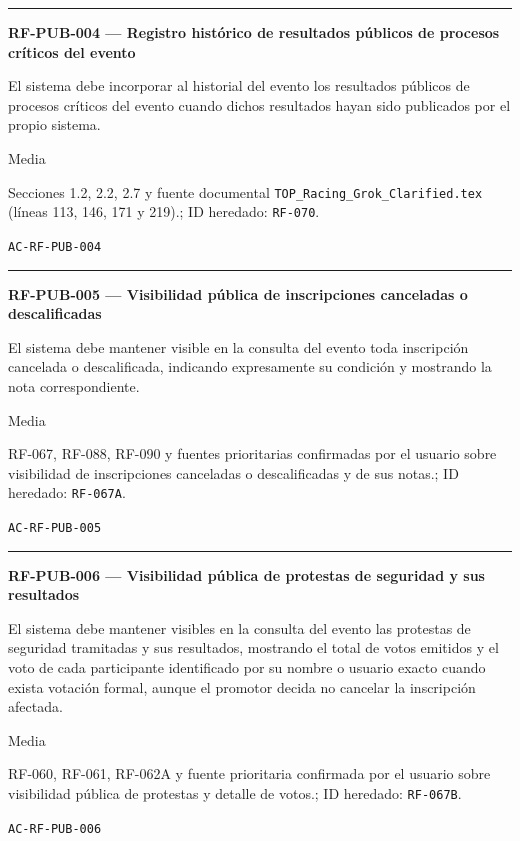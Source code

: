 \documentclass[10pt,letterpaper]{article}
\begin{document}
\vspace{0.25em}\hrule\vspace{0.65em}
\noindent\textbf{RF-PUB-004 --- Registro histórico de resultados públicos de procesos críticos del evento}\par
\begin{description}[style=nextline,leftmargin=3.15cm,labelwidth=2.8cm,font=\normalfont\bfseries]
\item[Obligación] El sistema debe incorporar al historial del evento los resultados públicos de procesos críticos del evento cuando dichos resultados hayan sido publicados por el propio sistema.
\item[Prioridad] Media
\item[Procedencia] Secciones 1.2, 2.2, 2.7 y fuente documental \texttt{TOP\_Racing\_Grok\_Clarified.tex} (líneas 113, 146, 171 y 219).; ID heredado: \texttt{RF-070}.
\item[Verificación] \texttt{AC-RF-PUB-004}
\end{description}
\vspace{0.25em}\hrule\vspace{0.65em}
\noindent\textbf{RF-PUB-005 --- Visibilidad pública de inscripciones canceladas o descalificadas}\par
\begin{description}[style=nextline,leftmargin=3.15cm,labelwidth=2.8cm,font=\normalfont\bfseries]
\item[Obligación] El sistema debe mantener visible en la consulta del evento toda inscripción cancelada o descalificada, indicando expresamente su condición y mostrando la nota correspondiente.
\item[Prioridad] Media
\item[Procedencia] RF-067, RF-088, RF-090 y fuentes prioritarias confirmadas por el usuario sobre visibilidad de inscripciones canceladas o descalificadas y de sus notas.; ID heredado: \texttt{RF-067A}.
\item[Verificación] \texttt{AC-RF-PUB-005}
\end{description}
\vspace{0.25em}\hrule\vspace{0.65em}
\noindent\textbf{RF-PUB-006 --- Visibilidad pública de protestas de seguridad y sus resultados}\par
\begin{description}[style=nextline,leftmargin=3.15cm,labelwidth=2.8cm,font=\normalfont\bfseries]
\item[Obligación] El sistema debe mantener visibles en la consulta del evento las protestas de seguridad tramitadas y sus resultados, mostrando el total de votos emitidos y el voto de cada participante identificado por su nombre o usuario exacto cuando exista votación formal, aunque el promotor decida no cancelar la inscripción afectada.
\item[Prioridad] Media
\item[Procedencia] RF-060, RF-061, RF-062A y fuente prioritaria confirmada por el usuario sobre visibilidad pública de protestas y detalle de votos.; ID heredado: \texttt{RF-067B}.
\item[Verificación] \texttt{AC-RF-PUB-006}
\end{description}
\end{document}
